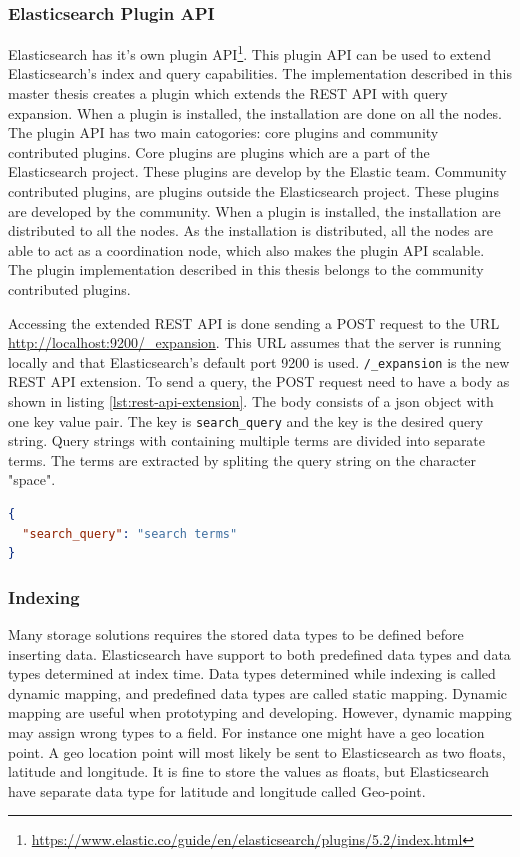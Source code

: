 \subsubsection{Elasticsearch Plugin API}
\label{sec:elasticsearch-plugin-api}
Elasticsearch has it's own plugin API\footnote{\url{https://www.elastic.co/guide/en/elasticsearch/plugins/5.2/index.html}}.
This plugin API can be used to extend Elasticsearch's index and query capabilities.
The implementation described in this master thesis creates a plugin which extends the REST API with query expansion.
When a plugin is installed, the installation are done on all the nodes.
The plugin API has two main catogories: core plugins and community contributed plugins.
Core plugins are plugins which are a part of the Elasticsearch project.
These plugins are develop by the Elastic team.
Community contributed plugins, are plugins outside the Elasticsearch project.
These plugins are developed by the community.
When a plugin is installed,
the installation are distributed to all the nodes.
As the installation is distributed,
all the nodes are able to act as a coordination node,
which also makes the plugin API scalable.
The plugin implementation described in this thesis belongs to the community contributed plugins.

Accessing the extended REST API is done sending a POST request to the URL \url{http://localhost:9200/_expansion}.
This URL assumes that the server is running locally and that Elasticsearch's default port 9200 is used.
\texttt{/\_expansion} is the new REST API extension.
To send a query, the POST request need to have a body as shown in listing \ref{lst:rest-api-extension}.
The body consists of a json object with one key value pair.
The key is \texttt{search\_query} and the key is the desired query string.
Query strings with containing multiple terms are divided into separate terms.
The terms are extracted by spliting the query string on the character "space".

\begin{lstlisting}[language=json, caption={The POST request body for the implemented query expansion.}, label={lst:rest-api-extension}]
{
  "search_query": "search terms"
}
\end{lstlisting}

\subsubsection{Indexing}
Many storage solutions requires the stored data types to be defined before inserting data.
Elasticsearch have support to both predefined data types and data types determined at index time.
Data types determined while indexing is called dynamic mapping, and predefined data types are called static mapping.
Dynamic mapping are useful when prototyping and developing.
However, dynamic mapping may assign wrong types to a field.
For instance one might have a geo location point.
A geo location point will most likely be sent to Elasticsearch as two floats, latitude and longitude.
It is fine to store the values as floats, but Elasticsearch have separate data type for latitude and longitude called Geo-point.

